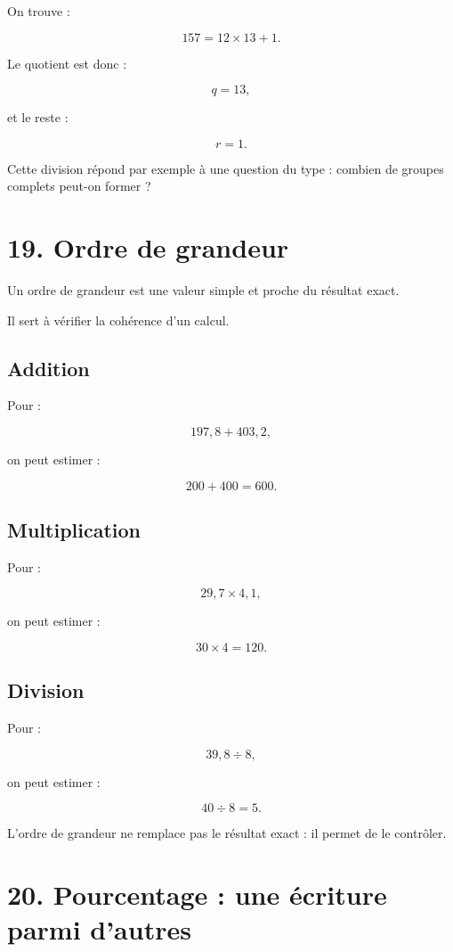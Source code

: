 On trouve :

\[
157=12\times13+1.
\]

Le quotient est donc :

\[
q=13,
\]

et le reste :

\[
r=1.
\]

Cette division répond par exemple à une question du type : combien de groupes complets peut-on former ?

\section{19. Ordre de grandeur}

Un ordre de grandeur est une valeur simple et proche du résultat exact.

Il sert à vérifier la cohérence d’un calcul.

\subsection{Addition}

Pour :

\[
197{,}8+403{,}2,
\]

on peut estimer :

\[
200+400=600.
\]

\subsection{Multiplication}

Pour :

\[
29{,}7\times4{,}1,
\]

on peut estimer :

\[
30\times4=120.
\]

\subsection{Division}

Pour :

\[
39{,}8\div8,
\]

on peut estimer :

\[
40\div8=5.
\]

L’ordre de grandeur ne remplace pas le résultat exact : il permet de le contrôler.

\section{20. Pourcentage : une écriture parmi d’autres}

